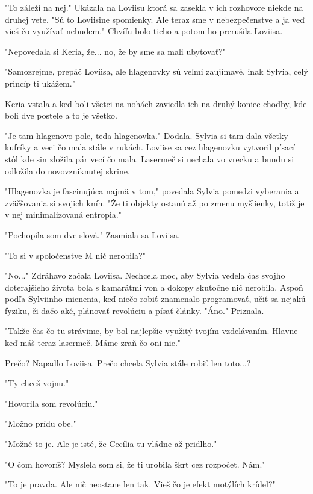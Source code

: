 \documentclass{book}
\begin{document}
"$ $To záleží na nej."$ $  Ukázala na Loviisu ktorá sa zasekla v ich rozhovore niekde na druhej vete. "$ $Sú to Loviisine spomienky. Ale teraz sme v nebezpečenstve a ja veď vieš čo využívať nebudem."$ $  Chvíľu bolo ticho a potom ho prerušila Loviisa.

"$ $Nepovedala si Keria, že... no, že by sme sa mali ubytovať?"$ $ 

"$ $Samozrejme, prepáč Loviisa, ale hlagenovky sú veľmi zaujímavé, inak Sylvia, celý princíp ti ukážem."$ $ 

Keria vstala a keď boli všetci na nohách zaviedla ich na druhý koniec chodby, kde boli dve postele a to je všetko.

"$ $Je tam hlagenovo pole, teda hlagenovka."$ $  Dodala. Sylvia si tam dala všetky kufríky a veci čo mala stále v rukách. Loviise sa cez hlagenovku vytvoril písací stôl kde sin zložila pár vecí čo mala. Lasermeč si nechala vo vrecku a bundu si odložila do novovzniknutej skrine.

"$ $Hlagenovka je fascinujúca najmä v tom,"$ $  povedala Sylvia pomedzi vyberania a zväčšovania si svojich kníh. "$ $Že ti objekty ostanú až po zmenu myšlienky, totiž je v nej minimalizovaná entropia."$ $ 

"$ $Pochopila som dve slová."$ $  Zasmiala sa Loviisa.

"$ $To si v spoločenstve M nič nerobila?"$ $ 

"$ $No..."$ $  Zdráhavo začala Loviisa. Nechcela moc, aby Sylvia vedela čas svojho doterajšieho života bola s kamarátmi von a dokopy skutočne nič nerobila. Aspoň podľa Sylviinho mienenia, keď niečo robiť znamenalo programovať, učiť sa nejakú fyziku, či dačo aké, plánovať revolúciu a písať články. "$ $Áno."$ $  Priznala.

"$ $Takže čas čo tu strávime, by bol najlepšie využitý tvojím vzdelávaním. Hlavne keď máš teraz lasermeč. Máme zraň čo oni nie."$ $ 

Prečo? Napadlo Loviisa. Prečo chcela Sylvia stále robiť len toto...?

"$ $Ty chceš vojnu."$ $ 

"$ $Hovorila som revolúciu."$ $ 

"$ $Možno prídu obe."$ $ 

"$ $Možné to je. Ale je isté, že Cecília tu vládne až pridlho."$ $ 

"$ $O čom hovoríš? Myslela som si, že ti urobila škrt cez rozpočet. Nám."$ $ 

"$ $To je pravda. Ale nič neostane len tak. Vieš čo je efekt motýlích krídel?"$ $ 
\end{document}
